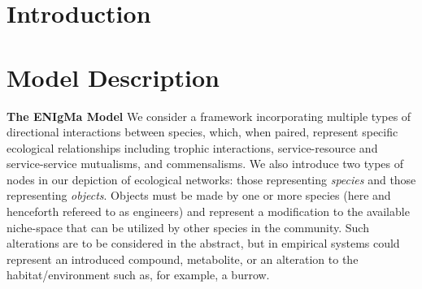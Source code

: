 \documentclass[twocolumn,preprintnumbers,amsmath,amssymb,superscriptaddress]{revtex4}
\begin{document}
\maketitle

\section*{Introduction}














\section*{Model Description}

\textbf{The ENIgMa Model} 
We consider a framework incorporating multiple types of directional interactions between species, which, when paired, represent specific ecological relationships including trophic interactions, service-resource and service-service mutualisms, and commensalisms.
We also introduce two types of nodes in our depiction of ecological networks: those representing \emph{species} and those representing \emph{objects}.
Objects must be made by one or more species (here and henceforth refereed to as engineers) and represent a modification to the available niche-space that can be utilized by other species in the community.
Such alterations are to be considered in the abstract, but in empirical systems could represent an introduced compound, metabolite, or an alteration to the habitat/environment such as, for example, a burrow.
\end{document}
